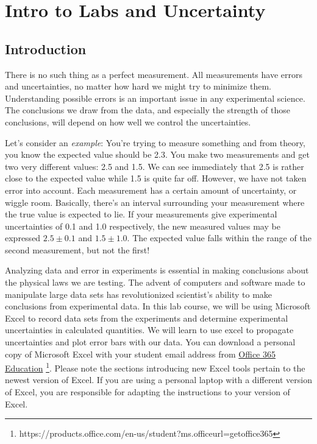 \chapter{Intro to Labs and Uncertainty}
\label{chap:excel}
\section{Introduction}

There is no such thing as a perfect measurement. All measurements have errors and uncertainties, no matter how hard we might try to minimize them. Understanding possible errors is an important issue in any experimental science. The conclusions we draw from the data, and especially the strength of those conclusions, will depend on how well we control the uncertainties. \myskip

Let's consider an \emph{example}: You're trying to measure something and from theory, you know the expected value should be 2.3. You make two measurements and get two very different values: 2.5 and 1.5. We can see immediately that 2.5 is rather close to the expected value while 1.5 is quite far off. However, we have not taken error into account. Each measurement has a certain amount of uncertainty, or wiggle room. Basically, there's an interval surrounding your measurement where the true value is expected to lie. If your measurements give experimental uncertainties of 0.1 and 1.0 respectively, the new measured values may be expressed $2.5\pm 0.1$ and $1.5\pm 1.0$. The expected value falls within the range of the second measurement, but not the first! \myskip

Analyzing data and error in experiments is essential in making conclusions about the physical laws we are testing. The advent of computers and software made to manipulate large data sets has revolutionized scientist's ability to make conclusions from experimental data. In this lab course, we will be using Microsoft Excel to record data sets from the experiments and determine experimental uncertainties in calculated quantities. We will learn to use excel to propagate uncertainties and plot error bars with our data. You can download a personal copy of Microsoft Excel with your student email address from
\href{https://products.office.com/en-us/student?ms.officeurl=getoffice365}{Office 365 Education} \footnote{https://products.office.com/en-us/student?ms.officeurl=getoffice365}. Please note the sections introducing new Excel tools pertain to the newest version of Excel. If you are using a personal laptop with a different version of Excel, you are responsible for adapting the instructions to your version of Excel. \myskip

